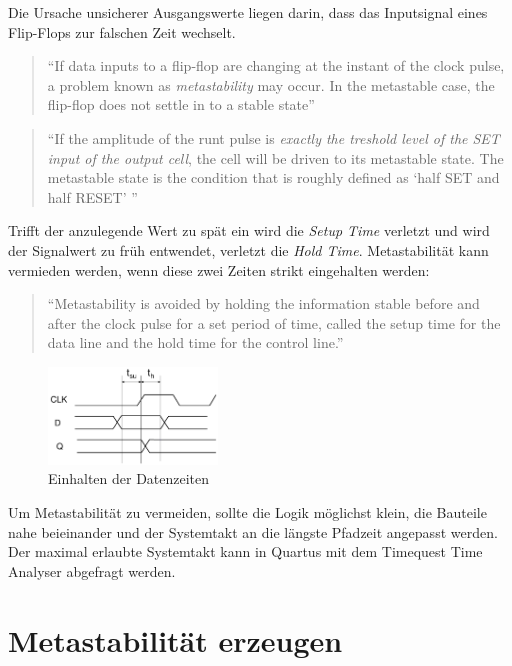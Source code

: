 Die Ursache unsicherer Ausgangswerte liegen darin, dass das Inputsignal eines Flip-Flops zur falschen Zeit wechselt.

\begin{quote}
``If data inputs to a flip-flop are changing at the instant of the clock pulse, a problem known as \textit{metastability} may occur. In the metastable case, the flip-flop does not settle in to a stable state'' \citep{ReferenceManual}
\end{quote}

\begin{quote}
``If the amplitude of the runt pulse is \textit{exactly the treshold level of the SET input of the output cell}, the cell will be driven to its metastable state. The metastable state is the condition that is roughly defined as `half SET and half RESET' '' \citep{F_metastability}
\end{quote}

Trifft der anzulegende Wert zu spät ein wird die \textit{Setup Time} verletzt und wird der Signalwert zu früh entwendet, verletzt die \textit{Hold Time}. Metastabilität kann vermieden werden, wenn diese zwei Zeiten strikt eingehalten werden:

\begin{quote}
``Metastability is avoided by holding the information stable before and after the clock pulse for a set period of time, called the setup time for the data line and the hold time for the control line.'' \citep{ReferenceManual}
\end{quote}

\begin{figure}[H]
	\includegraphics[width=0.4\textwidth]{images/metastability/kritscheZeit_FF.png}
	\caption{Einhalten der Datenzeiten}
	\label{fig.metastabil.kritisches_zeitfenster}
\end{figure}

Um Metastabilität zu vermeiden, sollte die Logik möglichst klein, die Bauteile nahe beieinander und der Systemtakt an die längste Pfadzeit angepasst werden. Der maximal erlaubte Systemtakt kann in Quartus mit dem Timequest Time Analyser abgefragt werden.

\section{Metastabilität erzeugen}\label{sect.meatastabil_erzeugen}

